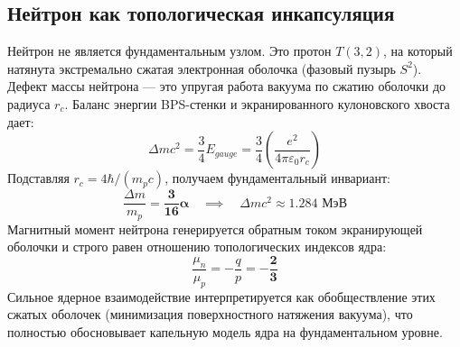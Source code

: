 \documentclass[12pt,a4paper]{article}
\begin{document}
	\subsection{Нейтрон как топологическая инкапсуляция}
	Нейтрон не является фундаментальным узлом. Это протон $T(3,2)$, на который натянута экстремально сжатая электронная оболочка (фазовый пузырь $S^2$).
	Дефект массы нейтрона — это упругая работа вакуума по сжатию оболочки до радиуса $r_c$. Баланс энергии BPS-стенки и экранированного кулоновского хвоста дает:
	\begin{equation}
		\Delta m c^2 = \frac{3}{4} E_{gauge} = \frac{3}{4} \left( \frac{e^2}{4\pi\varepsilon_0 r_c} \right)
	\end{equation}
	Подставляя $r_c = 4 \hbar / (m_p c)$, получаем фундаментальный инвариант:
	\begin{equation}
		\frac{\Delta m}{m_p} = \mathbf{\frac{3}{16} \alpha} \quad \implies \quad \Delta m c^2 \approx \mathbf{1.284 \text{ МэВ}}
	\end{equation}
	Магнитный момент нейтрона генерируется обратным током экранирующей оболочки и строго равен отношению топологических индексов ядра:
	\begin{equation}
		\frac{\mu_n}{\mu_p} = -\frac{q}{p} = \mathbf{-\frac{2}{3}}
	\end{equation}
	Сильное ядерное взаимодействие интерпретируется как обобществление этих сжатых оболочек (минимизация поверхностного натяжения вакуума), что полностью обосновывает капельную модель ядра на фундаментальном уровне.
		
\end{document}
